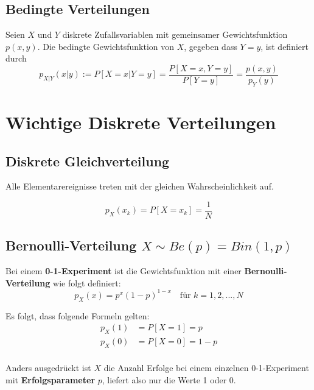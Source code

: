 \documentclass[11pt]{article}
\begin{document}
\subsection{Bedingte Verteilungen}

Seien $X$ und $Y$ diskrete Zufallsvariablen mit gemeinsamer Gewichtsfunktion $p(x, y)$. Die bedingte Gewichtsfunktion von $X$, gegeben dass $Y = y$, ist definiert durch
\begin{equation*}
	p_{X|Y}(x|y) := P[X=x|Y=y] = \frac{P[X=x,Y=y]}{P[Y=y]} = \frac{p(x,y)}{p_Y(y)}
\end{equation*}

\section{Wichtige Diskrete Verteilungen}

\subsection{Diskrete Gleichverteilung}

Alle Elementarereignisse treten mit der gleichen Wahrscheinlichkeit auf.

\begin{equation*}
	p_X(x_k) = P[X = x_k] = \frac{1}{N}
\end{equation*}

\subsection{Bernoulli-Verteilung $X \sim Be(p) = Bin(1,p)$}

Bei einem \textbf{0-1-Experiment} ist die Gewichtsfunktion mit einer \textbf{Bernoulli-Verteilung} wie folgt definiert:
\begin{equation*}
	p_X(x) = p^x(1-p)^{1-x} \quad\text{f{\"u}r } k = 1, 2, ..., N
\end{equation*}

Es folgt, dass folgende Formeln gelten:
\begin{equation*}
\begin{split}
	p_X(1) & = P[X = 1] = p \\
	p_X(0) & = P[X = 0] = 1-p \\
\end{split}
\end{equation*}

Anders ausgedr{\"u}ckt ist $X$ die Anzahl Erfolge bei einem einzelnen 0-1-Experiment mit \textbf{Erfolgsparameter} $p$, liefert also nur die Werte 1 oder 0.
\end{document}
